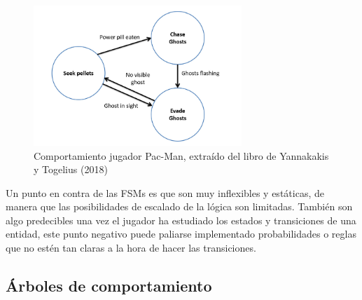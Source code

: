 \begin{figure}[h]
	\centering
	\includegraphics[width = 0.7\textwidth]{Imagenes/FMS_MsPac-man.png}
	\caption{Comportamiento jugador Pac-Man, extraído del libro de Yannakakis y Togelius (2018)}
	\label{fig:Comportamiento jugador Pac-Man}
\end{figure}

Un punto en contra de las FSMs es que son muy inflexibles y estáticas, de manera que las posibilidades de escalado de la lógica son limitadas. También son algo predecibles una vez el jugador ha estudiado los estados y transiciones de una entidad, este punto negativo puede paliarse implementado probabilidades o reglas que no estén tan claras a la hora de hacer las transiciones.

\subsection{Árboles de comportamiento}

